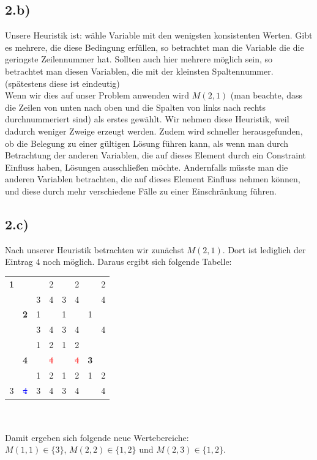 \documentclass[a4paper]{article}
\begin{document}
\subsection*{2.b)}
Unsere Heuristik ist: w\"ahle Variable mit den wenigsten konsistenten Werten. Gibt es mehrere, die diese Bedingung erf\"ullen, so betrachtet man die Variable die die geringste Zeilennummer hat. Sollten auch hier mehrere m\"oglich sein, so betrachtet man diesen Variablen, die mit der kleinsten Spaltennummer. (sp\"atestens diese ist eindeutig)\\
Wenn wir dies auf unser Problem anwenden wird $M(2,1)$ (man beachte, dass die Zeilen von unten nach oben und die Spalten von links nach rechts durchnummeriert sind) als erstes gew\"ahlt. Wir nehmen diese Heuristik, weil dadurch weniger Zweige erzeugt werden. Zudem wird schneller herausgefunden, ob die Belegung zu einer g\"ultigen  L\"osung f\"uhren kann, als wenn man durch Betrachtung der anderen Variablen, die auf dieses Element durch ein Constraint Einfluss haben, L\"osungen ausschlie\ss en m\"ochte. 
Andernfalls m\"usste man die anderen Variablen betrachten, die auf dieses Element Einfluss nehmen k\"onnen, und diese durch mehr verschiedene F\"alle zu einer Einschr\"ankung f\"uhren. \\

\subsection*{2.c)}
Nach unserer Heuristik betrachten wir zun\"achst $M(2,1)$. Dort ist lediglich der Eintrag $4$ noch möglich. Daraus ergibt sich folgende Tabelle:\\

\begin{tabular}{|cc|cc|cc|cc|}
\hline
\textbf{1}& & & 2 & & 2 & & 2\\
  & & 3 & 4 & 3 & 4 & & 4\\
\hline
 & \textbf{2} & 1 &  & 1 &  & 1 & \\
  &  & 3 & 4 & 3 & 4 &  & 4\\
\hline
&  & 1 & 2 & 1 & 2 &  & \\
  & \textbf{4} & & \textcolor{red}{\sout{4}} & & \textcolor{red}{\sout{4}} & \textbf{3} & \\
\hline
 &  & 1 & 2 & 1 & 2 & 1 & 2\\
 3 & \textcolor{blue}{\sout{4}} & 3 & 4 & 3 & 4 &  & 4\\
\hline
\end{tabular} \\
\\
Damit ergeben sich folgende neue Wertebereiche: \\
$M(1,1) \in \{ 3 \}$, $M(2,2) \in \{ 1,2 \}$ und $M(2,3) \in \{1,2\}$.
\end{document}
